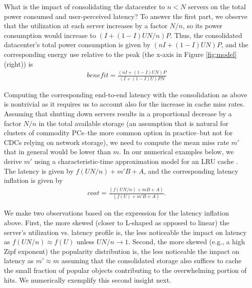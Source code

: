 What is the impact of consolidating the datacenter to $n<N$ servers on the total power consumed and user-perceived latency? To answer the first part, we observe that the utilization at each server increases by a factor $N/n$, so its power consumption would increase to $(I+(1-I)UN/n)P$. Thus, the consolidated datacenter's total power consumption is given by $(nI + (1-I)UN)P$, and the corresponding energy use relative to the peak (the x-axis in Figure  \ref{fig:model} (right)) is 
\begin{eqnarray}
\textit{benefit}  = \frac{ (nI + (1-I)UN)P}{(I+(1-I)U)PN}
\label{eq:benefit}
\end{eqnarray}

Computing the corresponding end-to-end latency with the consolidation as above is nontrivial as it requires us to account also for the increase in cache miss rates. Assuming that shutting down servers results in a proportional decrease by a factor $N/n$ in the total available storage (an assumption that is natural for clusters of commodity PCs--the more common option in practice--but not for CDCs relying on network storage), we need to compute the mean miss rate $m'$ that in general would be lower than $m$. In our numerical examples below, we derive $m'$ using a characteristic-time approximation model for an LRU cache \cite{che2002hierarchical}. 
The latency is given by $f(UN/n) + m'B + A$, and the corresponding latency 
inflation is given by 
\begin{eqnarray}
\textit{cost}  = \frac{ (f(UN/n) + mB + A)}{  (f(U) + m'B + A)}.
\label{eq:cost}
\end{eqnarray}

We make two observations based on the expression for the latency inflation above. First, the more skewed (closer to L-shaped as opposed to linear) the server's utilization vs. latency profile is, the less noticeable the impact on latency as $f(UN/n) \approx f(U)$ unless $UN/n \to 1$. Second, the more skewed (e.g., a high Zipf exponent) the popularity distribution is, the less noticeable the impact on latency as $m' \approx m$ assuming that the consolidated storage also suffices to cache the small fraction of popular objects contributing to the overwhelming portion of hits. We numerically exemplify this second insight next.
%

